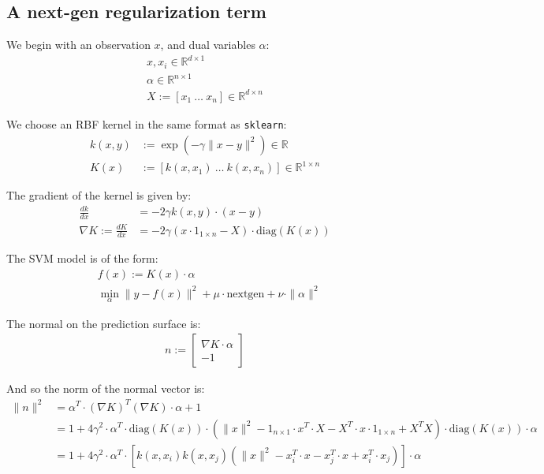 \documentclass[12pt]{article}
\begin{document}
\subsection{A next-gen regularization term}

We begin with an observation $x$, and dual variables $\alpha$:
\begin{align}
x, x_i \in \mathbb{R}^{d \times 1}\\
\alpha \in \mathbb{R}^{n \times 1}\\
X := \left[x_1 ~ \ldots ~ x_n\right] \in \mathbb{R}^{d \times n}
\end{align}

We choose an RBF kernel in the same format as \texttt{sklearn}:
\begin{align}
k(x,y) &:= \exp(-\gamma \|x-y\|^2) \in \mathbb{R}\\
K(x) &:= \left[k(x, x_1) ~ \ldots ~ k(x, x_n)\right]  \in \mathbb{R}^{1 \times n}
\end{align}

The gradient of the kernel is given by:
\begin{align}
\frac{dk}{dx} &= -2\gamma k(x,y) \cdot (x-y)\\
\nabla K := \frac{dK}{dx} &= -2\gamma\left( x \cdot 1_{1\times n}  - X \right) \cdot \mathrm{diag}(K(x))
\end{align}

The SVM model is of the form:
\begin{align}
&f(x) := K(x)\cdot \alpha\\
&\min_{\alpha} \|y - f(x)\|^2 + \mu\cdot \mathrm{nextgen} + \nu\cdot \|\alpha\|^2
\end{align}

The normal on the prediction surface is:
\begin{align}
n := \begin{bmatrix}\nabla K \cdot \alpha\\ -1\end{bmatrix}
\end{align}

And so the norm of the normal vector is:
\begin{align}
\|n\|^2 &= \alpha^T\cdot (\nabla K)^T (\nabla K) \cdot \alpha + 1\\
&= 1 + 4\gamma^2 \cdot \alpha^T \cdot \mathrm{diag}(K(x)) \cdot \left(\|x\|^2 - 1_{n\times 1} \cdot x^T \cdot X - X^T \cdot x \cdot 1_{1 \times n} + X^T X\right) \cdot \mathrm{diag}(K(x)) \cdot \alpha\\
&= 1 + 4\gamma^2 \cdot \alpha^T \cdot \left[ k(x,x_i)k(x,x_j)\left(\|x\|^2 - x_i^T\cdot x - x_j^T\cdot x + x_i^T\cdot x_j \right) \right] \cdot \alpha
\end{align}
\end{document}
